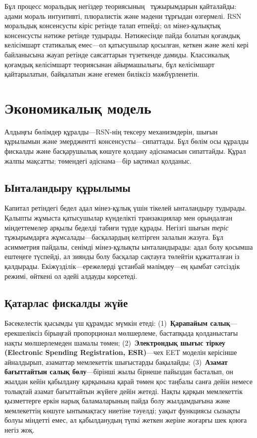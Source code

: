 \documentclass[11pt,a4paper,twocolumn]{article}
\begin{document}
Бұл процесс моральдық негіздер теориясының~\cite{haidt2012} тұжырымдарын қайталайды: адами мораль интуитивті, плюралистік және мәдени тұрғыдан өзгермелі. RSN моральдық консенсусты кіріс ретінде талап етпейді; ол мінез-құлықтық консенсусты нәтиже ретінде тудырады. Нәтижесінде пайда болатын қоғамдық келісімшарт статикалық емес---ол қатысушылар қосылған, кеткен және желі кері байланысына жауап ретінде саясаттарын түзеткенде дамиды. Классикалық қоғамдық келісімшарт теориясынан айырмашылығы, бұл келісімшарт қайтарылатын, байқалатын және егемен биліксіз мәжбүрленетін.

\section{Экономикалық модель}

Алдыңғы бөлімдер құралды---RSN-нің тексеру механизмдерін, шығын құрылымын және эмерджентті консенсусты---сипаттады. Бұл бөлім осы құралды фискалды және басқарушылық көшуге қолдану әдіснамасын сипаттайды. Құрал жалпы мақсатты; төмендегі әдіснама---бір ықтимал қолданыс.

\subsection{Ынталандыру құрылымы}

Капитал ретіндегі бедел адал мінез-құлық үшін тікелей ынталандыру тудырады. Қалыпты жұмыста қатысушылар күнделікті транзакциялар мен орындалған міндеттемелер арқылы беделді табиғи түрде құрады. Негізгі шығын \emph{теріс} тұжырымдарға жұмсалады---басқалардың келтірген залалын жазуға. Бұл асимметрия пайдалы, сенімді мінез-құлықты ынталандырады: адал болу қосымша ештеңеге түспейді, ал зиянды болу басқалар сақтауға төлейтін құжатталған із қалдырады. Екіжүзділік---ережелерді ұстанбай мәлімдеу---ең қымбат сәтсіздік режимі, өйткені ол әдейі алдауды көрсетеді.

\subsection{Қатарлас фискалды жүйе}

Бәсекелестік қысымды үш құрамдас мүмкін етеді: (1)~\textbf{Қарапайым салық}---ерекшеліксіз бірыңғай пропорционал мөлшерлеме, бастапқыда қолданыстағы нақты мөлшерлемеден шамалы төмен; (2)~\textbf{Электрондық шығыс тіркеу (Electronic Spending Registration, ESR)}---чех EET моделін керісінше айналдырып, азаматтар мемлекеттік шығыстарды бақылайды; (3)~\textbf{Азамат бағыттайтын салық бөлу}---бірінші жылы бірнеше пайыздан басталып, он жылдан кейін қабылдану қарқынына қарай төмен қос таңбалы санға дейін немесе толықтай азамат бағыттайтын жүйеге дейін жетеді. Нақты қарқын мемлекеттік қызметтерге еркін нарық баламаларының пайда болу жылдамдығына және мемлекеттің көшуге ынтымақтасу ниетіне тәуелді; уақыт функциясы сызықты болуы міндетті емес, ал қабылданудың түпкі жеткен жеріне жоғарғы шек қоюға негіз жоқ.
\end{document}
